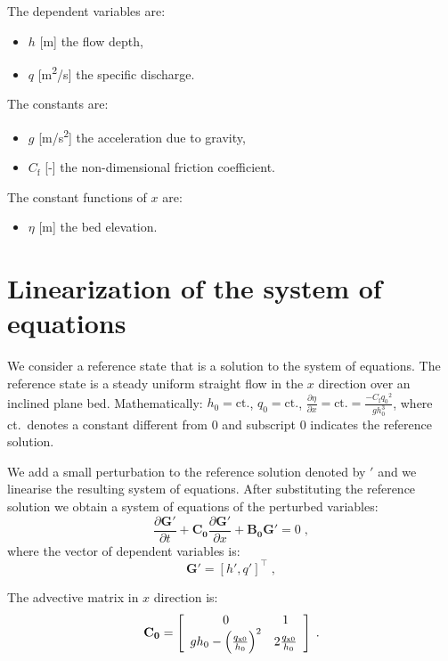 \documentclass{deltares_manual}
\newcommand{\mathsub}[2]{#1_{\mathrm{#2}}}
\begin{document}
The dependent variables are:
\begin{itemize}
\item $h$ [\si{m}] the flow depth,
\item $q$ [\si{m^2/s}] the specific discharge.
\end{itemize}

The constants are:
\begin{itemize}
\item $g$ [\si{m/s^2}] the acceleration due to gravity,
\item $\mathsub{C}{f}$ [-] the non-dimensional friction coefficient.
\end{itemize}

The constant functions of $x$ are:
\begin{itemize}
\item $\eta$ [\si{m}] the bed elevation. 
\end{itemize}

\section{Linearization of the system of equations}

We consider a reference state that is a solution to the system of equations. The reference state is a steady uniform straight flow in the $x$ direction over an inclined plane bed. Mathematically: $h_0=\text{ct.}$, $q_0=\text{ct.}$, $\frac{\partial \eta}{\partial x}=\text{ct.}=\frac{-\mathsub{C}{f}{q_0}^2}{gh_0^3}$, where ct.\ denotes a constant different from 0 and subscript $0$ indicates the reference solution. 

We add a small perturbation to the reference solution denoted by $'$ and we linearise the resulting system of equations. After substituting the reference solution we obtain a system of equations of the perturbed variables:
\begin{equation}
\label{eq:matrixf_sf}
	\frac{\partial \mathbf{G'}}{\partial t}+\mathbf{C_{0}}\frac{\partial \mathbf{G'}}{\partial x}+\mathbf{B_0}\mathbf{G'}=0 \;,
\end{equation}
where the vector of dependent variables is:
\begin{equation}
\label{eq:Q_l}
	\mathbf{G'}=\left[h',q'\right]^{\intercal} \;,
\end{equation}

The advective matrix in $x$ direction is:
\begin{equation}
\label{eq:Ax_sf}
\makebox[\textwidth][c]{$
		\mathbf{C_{0}}=\left[
 \begin{array}{cc}
  0 & 1  \\
	gh_0-\left(\frac{q_{\mathrm{x}0}}{h_0}\right)^2 & 2\frac{q_{\mathrm{x}0}}{h_0} \\
 \end{array}\right] \;.
$}
\end{equation}
\end{document}
